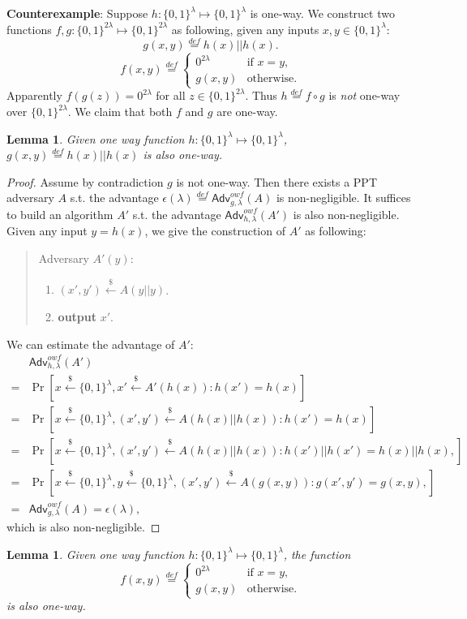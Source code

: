 \documentclass[12pt]{article}
\newcommand{\eqdef}{\stackrel{def}{=}}
\newcommand{\bits}{\{0,1\}}
\newcommand{\getsr}{\stackrel{\$}{\gets}}
\newcommand{\Adv}{\textsf{Adv}}
\newtheorem{lemma}[theorem]{Lemma}
\theoremstyle{definition}
\begin{document}
{\bf Counterexample}: Suppose $h : \bits^\lambda \mapsto \bits^\lambda$ is one-way. We construct two functions $f,g : \bits^{2\lambda} \mapsto \bits^{2\lambda}$ as following, given any inputs $x, y \in \bits^\lambda$:
$$g(x,y) \eqdef h(x) || h(x).$$
$$f(x,y) \eqdef
\begin{cases}
0^{2\lambda} & \textrm{if $x=y$,} \\
g(x,y) & \textrm{otherwise.}
\end{cases}$$
Apparently $f(g(z)) = 0^{2\lambda}$ for all $z\in\bits^{2\lambda}$. Thus $h\eqdef f\circ g$ is \emph{not} one-way over $\bits^{2\lambda}$.
We claim that both $f$ and $g$ are one-way.
\begin{lemma}
Given one way function $h : \bits^\lambda \mapsto \bits^\lambda$, $g(x,y) \eqdef h(x) || h(x)$ is also one-way.
\end{lemma}
\begin{proof}
Assume by contradiction $g$ is not one-way. Then there exists a PPT adversary $A$ s.t. the advantage $\epsilon(\lambda) \eqdef \Adv_{g,\lambda}^{owf}(A)$ is non-negligible. It suffices to build an algorithm $A'$ s.t. the advantage $\Adv_{h,\lambda}^{owf}(A')$ is also non-negligible. Given any input $y=h(x)$, we give the construction of $A'$ as following:
\begin{quote}
Adversary $A' (y)$:
\begin{enumerate}
\item $(x', y') \getsr A(y || y)$.
\item {\bf output} $x'$.
\end{enumerate}
\end{quote}
We can estimate the advantage of $A'$:
$$
\begin{aligned}
&\Adv_{h,\lambda}^{owf}(A') \\
=& \Pr[x\getsr \bits^\lambda, x' \getsr A'(h(x)) : h(x')=h(x)] \\
=& \Pr[x\getsr \bits^\lambda, (x', y') \getsr A(h(x) || h(x)) : h(x')=h(x)] \\
=& \Pr[x\getsr \bits^\lambda, (x', y') \getsr A(h(x) || h(x)) : h(x')||h(x') = h(x)||h(x), ] \\
=& \Pr[x \getsr \bits^\lambda, y \getsr \bits^\lambda, (x', y') \getsr A(g(x, y)) : g(x', y') = g(x, y), ] \\
=& \Adv_{g,\lambda}^{owf}(A) = \epsilon(\lambda),
\end{aligned}
$$
which is also non-negligible.
\end{proof}

\begin{lemma}
Given one way function $h : \bits^\lambda \mapsto \bits^\lambda$, the function
$$f(x,y) \eqdef
\begin{cases}
0^{2\lambda} & \textrm{if $x=y$,} \\
g(x,y) & \textrm{otherwise.}
\end{cases}$$
is also one-way.
\end{lemma}
\end{document}
